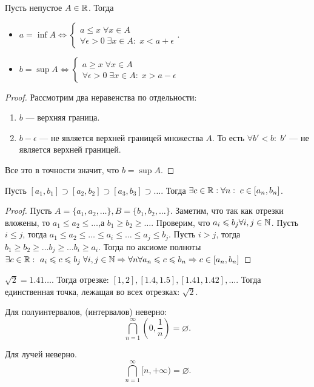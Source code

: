 \begin{theorem}
    Пусть непустое $A \in \mathbb{R}$. Тогда
\begin{itemize}
    \item $a = \inf A \iff \begin{cases} a \le x \; \forall x \in A \\ \forall \epsilon > 0 \; \exists x \in A: \; x < a + \epsilon \end{cases}$.
    \item $b = \sup A \iff \begin{cases} a \ge x \; \forall x \in A \\ \forall \epsilon > 0 \; \exists x \in A: \; x > a - \epsilon \end{cases}$
\end{itemize}
\end{theorem}
\begin{proof}
    Рассмотрим два неравенства по отдельности:
    \begin{enumerate}
        \item $b$ --- верхняя граница.
        \item  $b - \epsilon$ --- не является верхней границей множества  $A$. То есть  $\forall b' < b: \; b'$ --- не является верхней границей. 
    \end{enumerate}
    Все это в точности значит, что $b = \sup A$.
\end{proof}

\begin{theorem}
    Пусть $[a_1,b_1] \supset [a_2, b_2] \supset [a_3, b_3] \supset \ldots$. Тогда $\exists c \in \mathbb{R}: \forall n: \; c \in [a_n,b_n]$.
\end{theorem}
\begin{proof}
    Пусть $A = \{a_1,a_2,\ldots\}, B = \{b_1,b_2,\ldots\}$. Заметим, что так как отрезки вложены, то $a_1 \le a_2 \le \ldots$,а $b_1 \ge b_2 \ge \ldots$. Проверим, что $a_i \leqslant b_j \forall i, j \in \mathbb{N}$. Пусть $i \le j$, тогда $a_1 \le a_2 \le \ldots \le a_i \le \ldots \le a_j \le b_j$. Пусть $i > j$, тогда  $b_1 \ge b_2 \ge \ldots b_j \ge \ldots b_i \ge a_i$. Тогда по аксиоме полноты $\exists c \in \R: \ a_i \le c \le b_j  \; \forall i, j \in \N \Rightarrow \forall n \forall a_n \le c \le b_n \Rightarrow c\in[a_n,b_n]$
\end{proof}
\begin{remark}
    $\sqrt{2} = 1.41\ldots$. Тогда отрезке: $[1,2],[1.4,1.5],[1.41,1.42],\ldots$. Тогда единственная точка, лежащая во всех отрезках: $\sqrt{2}$.
\end{remark}
\begin{remark}
    Для полуинтервалов, (интервалов) неверно: \[
        \bigcap_{n=1}^\infty (0, \frac{1}{n}) = \varnothing
    .\]  
\end{remark}
\begin{remark}
    Для лучей неверно.\[
        \bigcap_{n=1}^\infty [n, +\infty) = \varnothing
    .\] 
\end{remark}
